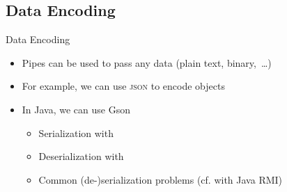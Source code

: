 {\subsection{Data Encoding}
\begin{frame}[fragile]{Data Encoding}
   \begin{itemize}[<+(1)->]
      \itemsep12pt
      \item Pipes can be used to pass any data (plain text, binary,~\ldots)
      \item For example, we can use \textsc{json} to encode objects
      \item In Java, we can use Gson \begin{itemize}
         \itemsep2pt
         \item Serialization with 
         \item Deserialization with 
         \item Common (de-)serialization problems (cf.  with Java RMI) %
      \end{itemize}
   \end{itemize}
\end{frame}
\SidebarReset
}

